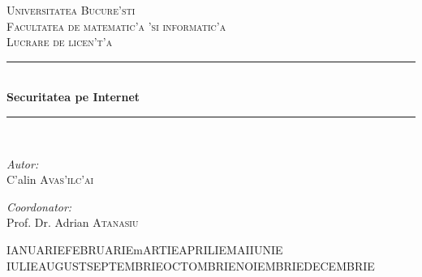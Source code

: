 
\newcommand{\HRule}{\rule{\linewidth}{0.5mm}}

\def\today{\space  \ifcase \month
\or IANUARIE\or FEBRUARIE\or mARTIE\or APRILIE\or MAI\or IUNIE\or
IULIE\or AUGUST\or SEPTEMBRIE\or OCTOMBRIE\or NOIEMBRIE\or DECEMBRIE \fi
\space  \number\year}

\begin{titlepage}
\begin{center}
  
\textsc{\LARGE Universitatea Bucure'sti}\\
\textsc{\LARGE Facultatea de matematic'a 'si informatic'a}\\[1.0cm]
 

\textsc{\Large Lucrare de licen't'a}\\[3.0cm]
 
 
\HRule \\[0.5cm]
{ \huge \bfseries Securitatea pe Internet}\\[0.4cm]
\HRule \\[4.5cm]
 
\begin{minipage}{0.4\textwidth}
\begin{flushleft} \large
\emph{Autor:}\\
C'alin \textsc{Avas'ilc'ai}
\end{flushleft}
\end{minipage}
\begin{minipage}{0.4\textwidth}
\begin{flushright} \large
\emph{Coordonator:} \\
Prof. Dr. Adrian \textsc{Atanasiu}
\end{flushright}
\end{minipage}
 
\vfill
 
{\large \today}
 
\end{center}
\end{titlepage}

